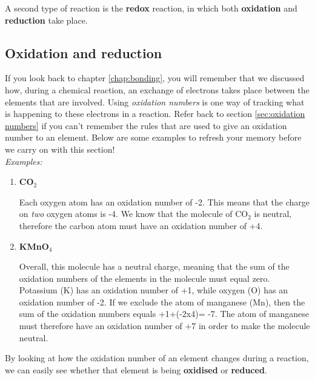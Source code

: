 A second type of reaction is the \textbf{redox} reaction, in which both \textbf{oxidation} and \textbf{reduction} take place. 

\subsection{Oxidation and reduction}

If you look back to chapter \ref{chap:bonding}, you will remember that we discussed how, during a chemical reaction, an exchange of electrons takes place between the elements that are involved. Using \textit{oxidation numbers} is one way of tracking what is happening to these electrons in a reaction. Refer back to section \ref{sec:oxidation numbers} if you can't remember the rules that are used to give an oxidation number to an element. Below are some examples to refresh your memory before we carry on with this section!\\

\textit{Examples:}

\begin{enumerate}
\item{\textbf{CO$_{2}$}

Each oxygen atom has an oxidation number of -2. This means that the charge on \textit{two} oxygen atoms is -4. We know that the molecule of CO$_{2}$ is neutral, therefore the carbon atom must have an oxidation number of +4.}

\item{\textbf{KMnO$_{4}$}

Overall, this molecule has a neutral charge, meaning that the sum of the oxidation numbers of the elements in the molecule must equal zero. Potassium (K) has an oxidation number of +1, while oxygen (O) has an oxidation number of -2. If we exclude the atom of manganese (Mn), then the sum of the oxidation numbers equals +1+(-2x4)= -7. The atom of manganese must therefore have an oxidation number of +7 in order to make the molecule neutral.\\
}
\end{enumerate}

By looking at how the oxidation number of an element changes during a reaction, we can easily see whether that element is being \textbf{oxidised} or \textbf{reduced}.



